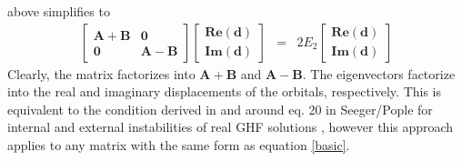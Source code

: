 \documentclass{revtex4}
\begin{document}
above simplifies to 
\begin{eqnarray}
  \begin{bmatrix}
    \mathbf{A + B} & \mathbf{0} \\
    \mathbf{0} & \mathbf{A - B} 
  \end{bmatrix}
  \begin{bmatrix}
    \mathbf{Re(d)} \\
    \mathbf{Im(d)} 
  \end{bmatrix}
  &=& 2E_2   
  \begin{bmatrix}
    \mathbf{Re(d)} \\
    \mathbf{Im(d)} 
  \end{bmatrix}
\end{eqnarray}
Clearly, the matrix factorizes into $\mathbf{A+B}$ and $\mathbf{A-B}$. The eigenvectors factorize
into the real and imaginary displacements of the orbitals, respectively. This is equivalent to the 
condition derived in and around eq. 20 in Seeger/Pople for internal and external instabilities of 
real
GHF solutions \cite{Seeger1977}, however this approach applies to any matrix with the same
form as equation \ref{basic}.
\end{document}
